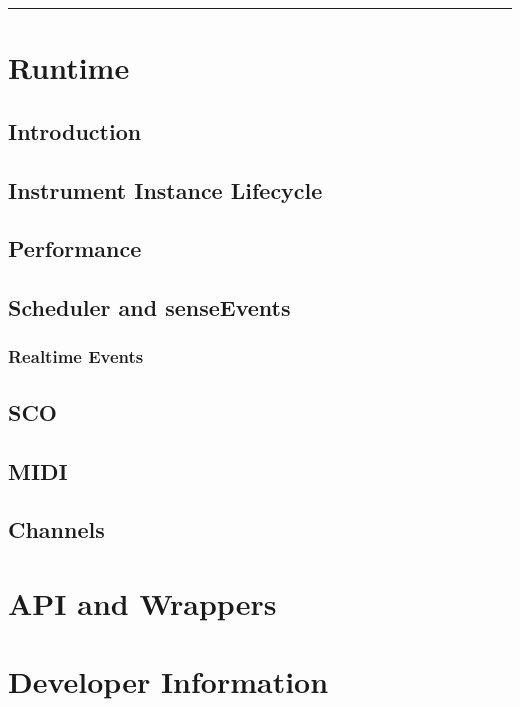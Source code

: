 \documentclass[]{book}
\begin{document}
\begin{center}\rule{3in}{0.4pt}\end{center}


\chapter{Runtime}

\section{Introduction}

\section{Instrument Instance Lifecycle}

\section{Performance}

\section{Scheduler and senseEvents}

\subsection{Realtime Events}

\section{SCO}

\section{MIDI}

\section{Channels}


\chapter{API and Wrappers}



\chapter{Developer Information}
\end{document}

